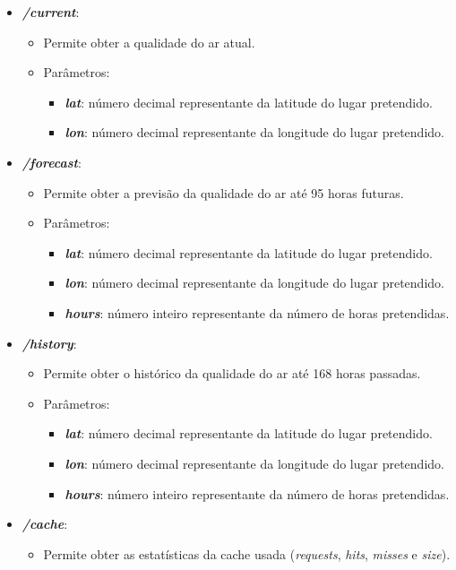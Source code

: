 \begin{itemize}
   \item \textbf{\textit{/current}}:
      \begin{itemize}
         \item Permite obter a qualidade do ar atual.
         \item Parâmetros:
            \begin{itemize}
               \item \textbf{\textit{lat}}: número decimal representante da latitude do lugar pretendido.
               \item \textbf{\textit{lon}}: número decimal representante da longitude do lugar pretendido.
            \end{itemize}
      \end{itemize}
   \item \textbf{\textit{/forecast}}:
      \begin{itemize}
         \item Permite obter a previsão da qualidade do ar até 95 horas futuras.
         \item Parâmetros:
            \begin{itemize}
               \item \textbf{\textit{lat}}: número decimal representante da latitude do lugar pretendido.
               \item \textbf{\textit{lon}}: número decimal representante da longitude do lugar pretendido.
               \item \textbf{\textit{hours}}: número inteiro representante da número de horas pretendidas.
            \end{itemize}
      \end{itemize}
   \item \textbf{\textit{/history}}:
      \begin{itemize}
         \item Permite obter o histórico da qualidade do ar até 168 horas passadas.
         \item Parâmetros:
            \begin{itemize}
               \item \textbf{\textit{lat}}: número decimal representante da latitude do lugar pretendido.
               \item \textbf{\textit{lon}}: número decimal representante da longitude do lugar pretendido.
               \item \textbf{\textit{hours}}: número inteiro representante da número de horas pretendidas.
            \end{itemize}
      \end{itemize}
   \item \textbf{\textit{/cache}}:
      \begin{itemize}
         \item Permite obter as estatísticas da cache usada (\textit{requests}, \textit{hits}, \textit{misses} e \textit{size}).
      \end{itemize}
\end{itemize}

